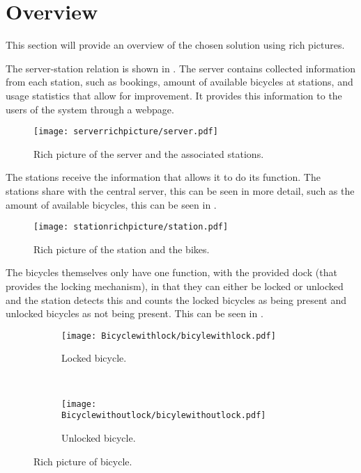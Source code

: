 \section{Overview}
This section will provide an overview of the chosen solution using rich pictures.

The server-station relation is shown in . 
The server contains collected information from each station, such as bookings, amount of available bicycles at stations, and usage statistics that allow for improvement.
It provides this information to the users of the system through a webpage.

\begin{figure}[h]
\centering
\texttt{[image: serverrichpicture/server.pdf]}
\caption{Rich picture of the server and the associated stations.}
\label{fig:ServerRichPicture}
\end{figure}

The stations receive the information that allows it to do its function. The stations share with the central server, this can be seen in more detail, such as the amount of available bicycles, this can be seen in .

\begin{figure}[h]
\centering
\texttt{[image: stationrichpicture/station.pdf]}
\caption{Rich picture of the station and the bikes.}
\label{fig:StationRichPicture}
\end{figure}

The bicycles themselves only have one function, with the provided dock (that provides the locking mechanism), in that they can either be locked or unlocked and the station detects this and counts the locked bicycles as being present and unlocked bicycles as not being present. 
This can be seen in .

\begin{figure}[h]
\centering
\begin{subfigure}[b]{0.3\textwidth}
\centering
\texttt{[image: Bicyclewithlock/bicylewithlock.pdf]}
\caption{Locked bicycle.}
\label{fig:BicycleLocked}
\end{subfigure}
~
\begin{subfigure}[b]{0.3\textwidth}
\centering
\texttt{[image: Bicyclewithoutlock/bicylewithoutlock.pdf]}
\caption{Unlocked bicycle.}
\label{fig:BicycleUnlocked}
\end{subfigure}
\caption{Rich picture of bicycle.}
\label{fig:Bicycles}
\end{figure}